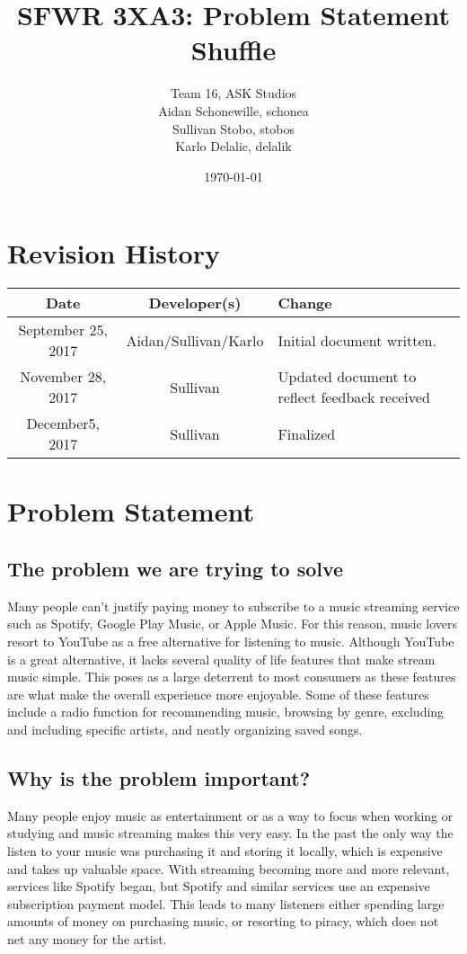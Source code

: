 \documentclass[12pt, a4paper]{article}
\title{SFWR 3XA3: Problem Statement Shuffle}
\author{Team 16, ASK Studios
        \\ Aidan Schonewille, schonea
        \\ Sullivan Stobo, stobos
        \\ Karlo Delalic, delalik
}
\begin{document}
\date{\today}

\section*{Revision History}
\begin{center}
\begin{tabular}{| c | c | p{6cm} |}
\hline
\textbf{Date} & \textbf{Developer(s)} & \textbf{Change}\\
\hline
September 25, 2017 & Aidan/Sullivan/Karlo & Initial document written.\\
\hline
November 28, 2017 & Sullivan & Updated document to reflect feedback received \\
\hline
December5, 2017 & Sullivan & Finalized \\
\hline
\end{tabular}
\end{center}

\maketitle
\section{Problem Statement}
\subsection{The problem we are trying to solve}
Many people can't justify paying money to subscribe to a music streaming service such as Spotify, Google Play Music, or Apple Music. For this reason, music lovers resort to YouTube as a free alternative for listening to music. Although YouTube is a great alternative, it lacks several quality of life features that make stream music simple. This poses as a large deterrent to most consumers as these features are what make the overall experience more enjoyable. Some of these features include a radio function for recommending music, browsing by genre, excluding and including specific artists, and neatly organizing saved songs.

\subsection{Why is the problem important?}
Many people enjoy music as entertainment or as a way to focus when working or studying and music streaming makes this very easy. In the past the only way the listen to your music was purchasing it and storing it locally, which is expensive and takes up valuable space.  With streaming becoming more and more relevant, services like Spotify began, but Spotify and similar services use an expensive subscription payment model.  This leads to many listeners either spending large amounts of money on purchasing music, or resorting to piracy, which does not net any money for the artist.
\end{document}
